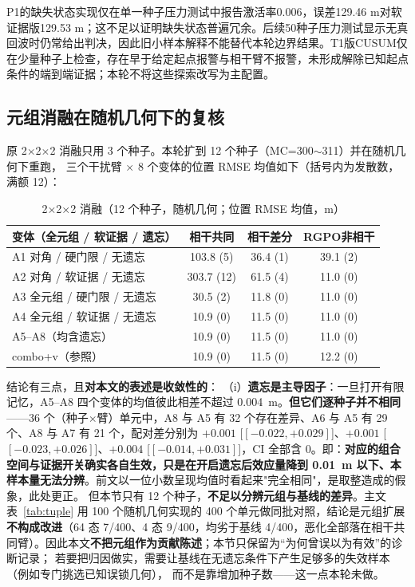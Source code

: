 \documentclass[UTF8,a4paper,zihao=-4]{ctexart}
\begin{document}
P1的缺失状态实现仅在单一种子压力测试中报告激活率0.006，误差129.46 m对软证据版129.53 m；这不足以证明缺失状态普遍冗余。后续50种子压力测试显示无真回波时仍常给出判决，因此旧小样本解释不能替代本轮边界结果。T1版CUSUM仅在少量种子上检查，存在早于给定起点报警与相干臂不报警，未形成解除已知起点条件的端到端证据；本轮不将这些探索改写为主配置。

\subsection{元组消融在随机几何下的复核}\label{sup:abl-jgeom}

原 2$\times$2$\times$2 消融只用 3 个种子。本轮扩到 12 个种子（MC=300$\sim$311）并在随机几何下重跑，
三个干扰臂 × 8 个变体的位置 RMSE 均值如下（括号内为发散数，满额 12）：

\begin{table}[htbp]\centering\small
\caption{2$\times$2$\times$2 消融（12 个种子，随机几何；位置 RMSE 均值，m）}\label{tab:abl-jgeom}
\begin{tabular}{@{}lccc@{}}\toprule
变体（全元组 / 软证据 / 遗忘） & 相干共同 & 相干差分 & RGPO非相干 \\ \midrule
A1 对角 / 硬门限 / 无遗忘 & 103.8 (5) & 36.4 (1) & 39.1 (2) \\
A2 对角 / 软证据 / 无遗忘 & 303.7 (12) & 61.5 (4) & 11.0 (0) \\
A3 全元组 / 硬门限 / 无遗忘 & 30.5 (2) & 11.8 (0) & 11.0 (0) \\
A4 全元组 / 软证据 / 无遗忘 & 10.9 (0) & 11.5 (0) & 11.0 (0) \\
A5--A8（均含遗忘） & 10.9 (0) & 11.5 (0) & 11.0 (0) \\
combo+v（参照） & 10.9 (0) & 11.5 (0) & 12.2 (0) \\
\bottomrule\end{tabular}\end{table}

结论有三点，且\textbf{对本文的表述是收敛性的}：
（i）\textbf{遗忘是主导因子}：一旦打开有限记忆，A5--A8 四个变体的均值彼此相差不超过 0.004~m。\textbf{但它们逐种子并不相同}——36 个（种子$\times$臂）单元中，A8 与 A5 有 32 个存在差异、A6 与 A5 有 29 个、A8 与 A7 有 21 个，配对差分别为 $+0.001$ [$[-0.022,+0.029]$]、$+0.001$ [$[-0.023,+0.026]$]、$+0.004$ [$[-0.014,+0.031]$]，CI 全部含 0。即：\textbf{对应的组合空间与证据开关确实各自生效，只是在开启遗忘后效应量降到 0.01~m 以下、本样本量无法分辨}。前文以一位小数呈现均值时看起来"完全相同"，是取整造成的假象，此处更正。
但本节只有 12 个种子，\textbf{不足以分辨元组与基线的差异}。主文表~\ref{tab:tuple} 用 100 个随机几何实现的 400 个单元做同批对照，结论是元组扩展\textbf{不构成改进}（64 态 7/400、4 态 9/400，均劣于基线 4/400，恶化全部落在相干共同臂）。因此本文\textbf{不把元组作为贡献陈述}；本节只保留为“为何曾误以为有效”的诊断记录；
若要把归因做实，需要让基线在无遗忘条件下产生足够多的失效样本（例如专门挑选已知误锁几何），
而不是靠增加种子数——这一点本轮未做。
\end{document}
